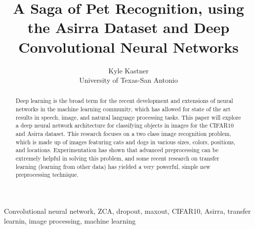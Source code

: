 \documentclass[journal]{IEEEtran}
\begin{document}
\title{A Saga of Pet Recognition, using the Asirra Dataset 
       and Deep Convolutional Neural Networks}

\author{Kyle Kastner\\University of Texas-San Antonio}

\maketitle

\begin{abstract}
Deep learning is the broad term for the recent development and extensions 
of neural networks in the machine learning community, which has allowed for
state of the art results in speech, image, and natural language processing
tasks. This paper will explore a deep neural network architecture for
classifying objects in images for the CIFAR10 and Asirra dataset. 
This research focuses on a two class image recognition 
problem, which is made up of images featuring cats and
dogs in various sizes, colors, positions, and locations. Experimentation has
shown that advanced preprocessing can be extremely helpful in solving this 
problem, and some recent research on transfer learning (learning from other
data) has yielded a very powerful, simple new preprocessing technique.
\end{abstract}

\begin{IEEEkeywords}
Convolutional neural network, ZCA, dropout, maxout, CIFAR10, Asirra, 
transfer learnin, image processing, machine learning 
\end{IEEEkeywords}

\IEEEpeerreviewmaketitle
\end{document}
